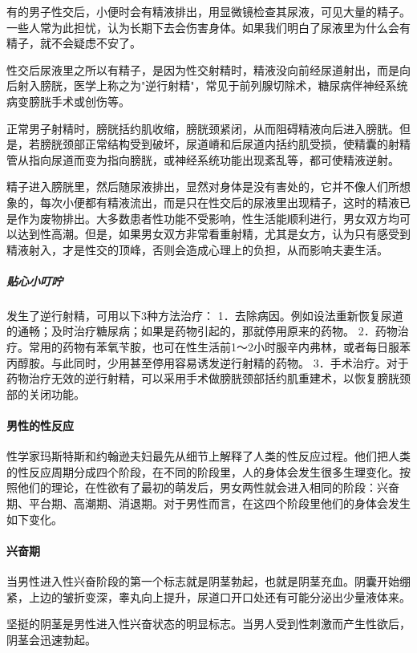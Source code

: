 \begin{enumerate}
有的男子性交后，小便时会有精液排出，用显微镜检查其尿液，可见大量的精子。一些人常为此担忧，认为长期下去会伤害身体。如果我们明白了尿液里为什么会有精子，就不会疑虑不安了。

性交后尿液里之所以有精子，是因为性交射精时，精液没向前经尿道射出，而是向后射入膀胱，医学上称之为"逆行射精"，常见于前列腺切除术，糖尿病伴神经系统病变膀胱手术或创伤等。

正常男子射精时，膀胱括约肌收缩，膀胱颈紧闭，从而阻碍精液向后进入膀胱。但是，若膀胱颈部正常结构受到破坏，尿道嵴和后尿道内括约肌受损，使精囊的射精管从指向尿道而变为指向膀胱，或神经系统功能出现紊乱等，都可使精液逆射。

精子进入膀胱里，然后随尿液排出，显然对身体是没有害处的，它并不像人们所想象的，每次小便都有精液流出，而是只在性交后的尿液里出现精子，这时的精液已是作为废物排出。大多数患者性功能不受影响，性生活能顺利进行，男女双方均可以达到性高潮。但是，如果男女双方非常看重射精，尤其是女方，认为只有感受到精液射入，才是性交的顶峰，否则会造成心理上的负担，从而影响夫妻生活。

\subparagraph{贴心小叮咛}

发生了逆行射精，可用以下3种方法治疗：
1．去除病因。例如设法重新恢复尿道的通畅；及时治疗糖尿病；如果是药物引起的，那就停用原来的药物。
2．药物治疗。常用的药物有苯氧苄胺，也可在性生活前1～2小时服辛内弗林，或者每日服苯丙醇胺。与此同时，少用甚至停用容易诱发逆行射精的药物。
3．手术治疗。对于药物治疗无效的逆行射精，可以采用手术做膀胱颈部括约肌重建术，以恢复膀胱颈部的关闭功能。

\paragraph{男性的性反应}

性学家玛斯特斯和约翰逊夫妇最先从细节上解释了人类的性反应过程。他们把人类的性反应周期分成四个阶段，在不同的阶段里，人的身体会发生很多生理变化。按照他们的理论，在性欲有了最初的萌发后，男女两性就会进入相同的阶段：兴奋期、平台期、高潮期、消退期。对于男性而言，在这四个阶段里他们的身体会发生如下变化。

\paragraph{兴奋期}

当男性进入性兴奋阶段的第一个标志就是阴茎勃起，也就是阴茎充血。阴囊开始绷紧，上边的皱折变深，睾丸向上提升，尿道口开口处还有可能分泌出少量液体来。

坚挺的阴茎是男性进入性兴奋状态的明显标志。当男人受到性刺激而产生性欲后，阴茎会迅速勃起。


\end{enumerate}
